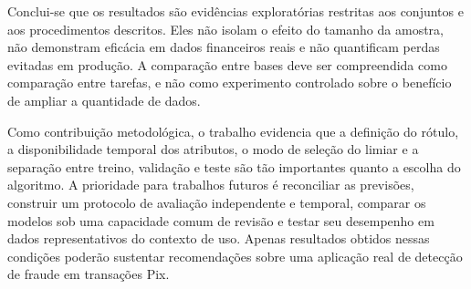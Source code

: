 \documentclass[11pt,a4paper]{article}
\begin{document}
Conclui-se que os resultados são evidências exploratórias restritas aos conjuntos e aos procedimentos descritos. Eles não isolam o efeito do tamanho da amostra, não demonstram eficácia em dados financeiros reais e não quantificam perdas evitadas em produção. A comparação entre bases deve ser compreendida como comparação entre tarefas, e não como experimento controlado sobre o benefício de ampliar a quantidade de dados.

Como contribuição metodológica, o trabalho evidencia que a definição do rótulo, a disponibilidade temporal dos atributos, o modo de seleção do limiar e a separação entre treino, validação e teste são tão importantes quanto a escolha do algoritmo. A prioridade para trabalhos futuros é reconciliar as previsões, construir um protocolo de avaliação independente e temporal, comparar os modelos sob uma capacidade comum de revisão e testar seu desempenho em dados representativos do contexto de uso. Apenas resultados obtidos nessas condições poderão sustentar recomendações sobre uma aplicação real de detecção de fraude em transações Pix.

\printbibliography%
\end{document}
